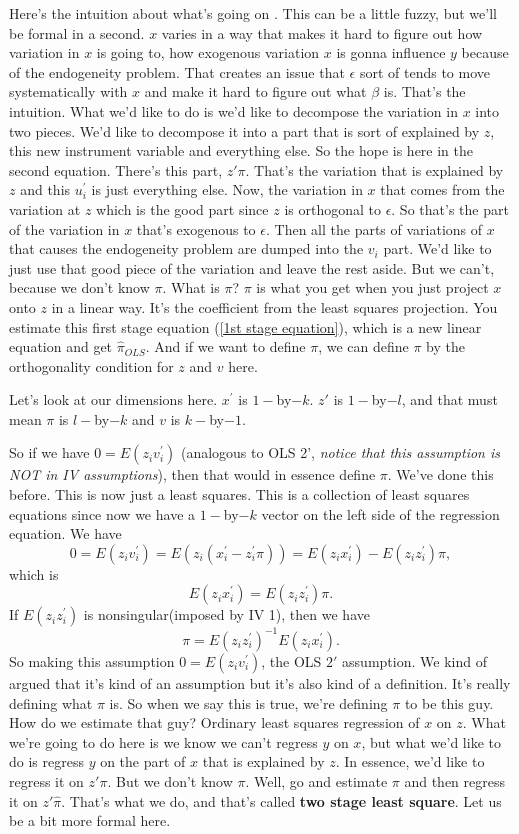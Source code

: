 \documentclass[11pt,a4paper]{amsart}
\theoremstyle{plain}
\theoremstyle{definition}
\begin{document}
	Here's the intuition about what's going on . This can be a little fuzzy, but we'll be formal in a second. $x$ varies in a way that makes it hard to figure out how variation in $x$ is going to, how exogenous variation $x$ is gonna influence $y$ because of the endogeneity problem. That creates an issue that $\epsilon$ sort of tends to move systematically  with $x$ and make it hard to figure out what $\beta$ is. That's the intuition. What we'd like to do is we'd like to decompose the variation in $x$ into two pieces. We'd like to decompose it into a part that is sort of explained by $z$, this new instrument variable and everything else. So the hope is here in the second equation.  There's this part, $z' \pi$. That's the variation that is explained by $z$ and this $u^{'}_{i}$ is just everything else. Now, the variation in $x$ that comes from the variation at $z$ which is the good part since $z$ is orthogonal to $\epsilon$. So that's the part of the variation in $x$ that's exogenous to $\epsilon$. Then all the parts of variations of $x$ that causes the endogeneity problem are dumped into the $v_{i}$ part. We'd like to just use that good piece of the variation and leave the rest aside. But we can't, because we don't know $\pi$. What is $\pi$? $\pi$ is what you get when you just project $x$ onto $z$ in a linear way. It's the coefficient from the least squares projection. You estimate this first stage equation (\ref{1st stage equation}), which is a new linear equation and get $\hat{\pi}_{OLS}$. And  if we want to define $\pi$, we can define $\pi$ by the orthogonality condition for $z$ and $v$ here. \par 
	Let's look at our dimensions here. $x^{'}$ is $1-$by$-k$. $z'$ is $1-$by$-l$, and that must mean $\pi$ is $l-$by$-k$ and $v$ is $k-$by$-1$.\par 
	 So if we have $0 = E(z_{i}v^{'}_{i})$ (analogous to OLS 2', \emph{notice that this assumption is NOT in IV assumptions}), then that would in essence define $\pi$. We've done this before. This is now just a least squares. This is a collection of least squares equations since now we have a $1-$by$-k$ vector on the left side of the regression equation. \newline
	 We have 
	 \[	0 = E(z_{i}v^{'}_{i}) = E(z_{i}(x^{'}_{i}-z^{'}_{i}\pi)) = E(z_{i}x^{'}_{i}) - E(z_{i}z^{'}_{i})\pi,	\]
	 which is 
	 \[	E(z_{i}x^{'}_{i}) = E(z_{i}z^{'}_{i})\pi.	\]
	 If $E(z_{i}z^{'}_{i})$ is nonsingular(imposed by IV 1), then we have 
	 \[		\pi = E(z_{i}z^{'}_{i})^{-1}E(z_{i}x^{'}_{i}).	\]
	 So making this assumption $0 = E(z_{i}v^{'}_{i})$, the OLS $2'$ assumption. We kind of argued that it's kind of an assumption but it's also kind of a definition. It's really defining what $\pi$ is. So when we say this is true, we're defining $\pi$ to be this guy. How do we estimate that guy? Ordinary least squares regression of $x$ on $z$. What we're going to do here is we know we can't regress $y$ on $x$, but what we'd like to do is regress $y$ on the part of $x$ that is explained by $z$. In essence, we'd like to regress it on $z' \pi$.  But we don't know $\pi$. Well, go and estimate $\pi$ and then regress it on $z' \hat{\pi}$. That's what we do, and that's called \textbf{two stage least square}. Let us be a bit more formal here.
\end{document}

